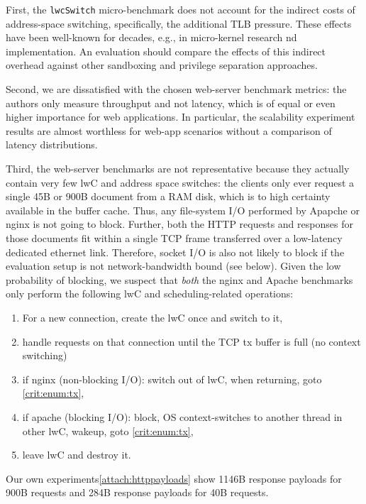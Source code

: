 \documentclass[10pt,twocolumn,letter]{article}
\begin{document}
First, the \lstinline{lwcSwitch} micro-benchmark does not account for the indirect costs of address-space switching, specifically, the additional TLB pressure.
These effects have been well-known for decades, e.g., in micro-kernel research  nd implementation. \cite{liedtke1997achievedipcperformance} 
An evaluation should compare the effects of this indirect overhead against other sandboxing and privilege separation approaches.

Second, we are dissatisfied with the chosen web-server benchmark metrics:
the authors only measure throughput and not latency, which is of equal or even higher importance for web applications.
In particular, the scalability experiment results are almost worthless for web-app scenarios without a comparison of latency distributions.

Third, the web-server benchmarks are not representative because they actually contain very few lwC and address space switches:
the clients only ever request a single 45B or 900B document from a RAM disk, which is to high certainty available in the buffer cache.
Thus, any file-system I/O performed by Apapche or nginx is not going to block.
Further, both the HTTP requests and responses for those documents fit within a single TCP frame transferred over a low-latency dedicated ethernet link.
Therefore, socket I/O is also not likely to block if the evaluation setup is not network-bandwidth bound (see below).
Given the low probability of blocking, we suspect that \textit{both} the nginx and Apache benchmarks only perform the following lwC and scheduling-related operations:
\begin{enumerate}[itemsep=0pt,parsep=0pt]
\item For a new connection, create the lwC once and switch to it,
\item\label{crit:enum:tx} handle requests on that connection until the TCP tx buffer is full (no context switching)
\item if nginx (non-blocking I/O): switch out of lwC, when returning, goto \ref{crit:enum:tx},
\item if apache (blocking I/O): block, OS context-switches to another thread in other lwC, wakeup, goto \ref{crit:enum:tx},
\item leave lwC and destroy it.
\end{enumerate}
Our own experiments\ref{attach:httppayloads} show 1146B response payloads for 900B requests and 284B response payloads for 40B requests.
\end{document}
